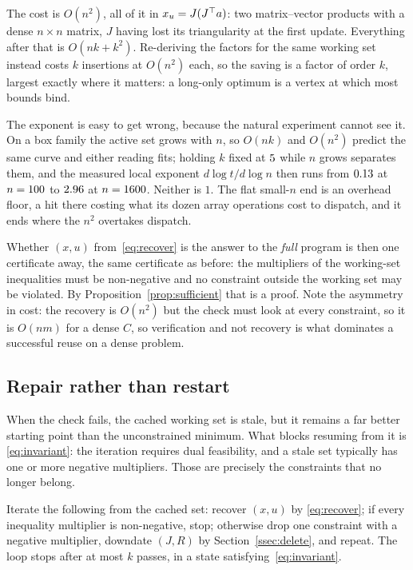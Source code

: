 The cost is $O(n^2)$, all of it in $x_u = J(J^{\top} a)$: two matrix--vector products with
a dense $n \times n$ matrix, $J$ having lost its triangularity at the first update.
Everything after that is $O(nk + k^2)$. Re-deriving the factors for the
same working set instead costs $k$ insertions at $O(n^2)$ each, so the saving is a
factor of order $k$, largest exactly where it matters: a long-only optimum is a
vertex at which most bounds bind.

The exponent is easy to get wrong, because the natural experiment cannot see it.
On a box family the active set grows with $n$, so $O(nk)$ and $O(n^2)$ predict the
same curve and either reading fits; holding $k$ fixed at $5{}$ while
$n$ grows separates them, and the measured local exponent
$d\log t/d\log n$ then runs from $0.13$ at $n = 100{}$ to
$2.96$ at $n = 1600{}$. Neither is $1$. The flat small-$n$ end is
an overhead floor, a hit there costing what its dozen array operations cost to
dispatch, and it ends where the $n^2$ overtakes dispatch.

Whether $(x,u)$ from~\eqref{eq:recover} is the answer to the \emph{full} program
is then one certificate away, the same certificate as before: the
multipliers of the working-set inequalities must be non-negative and no constraint
outside the working set may be violated. By
Proposition~\ref{prop:sufficient} that is a proof. Note the asymmetry in cost: the
recovery is $O(n^2)$ but the check must look at every constraint, so it is
$O(nm)$ for a dense $C$, so verification and not recovery is what dominates a
successful reuse on a dense problem.

\subsection{Repair rather than restart}

When the check fails, the cached working set is stale, but it remains a far better
starting point than the unconstrained minimum. What blocks resuming from it is
\eqref{eq:invariant}: the iteration requires dual feasibility, and a stale set
typically has one or more negative multipliers. Those are precisely the
constraints that no longer belong.

\begin{proposition}\label{prop:repair}
Iterate the following from the cached set: recover $(x,u)$ by
\eqref{eq:recover}; if every inequality multiplier is non-negative, stop;
otherwise drop one constraint with a negative multiplier, downdate $(J,R)$ by
Section~\ref{ssec:delete}, and repeat. The loop stops after at most $k$ passes, in
a state satisfying~\eqref{eq:invariant}.
\end{proposition}

